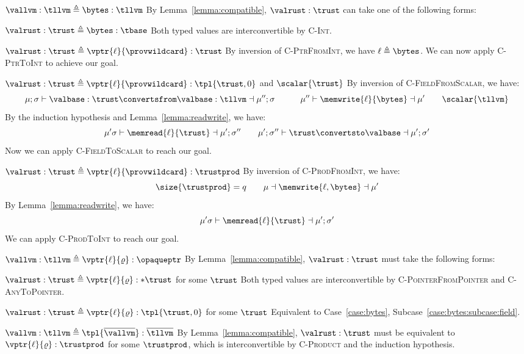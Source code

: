 
\begin{bycases}
\begin{case}{$\vallvm:\tllvm \triangleq \bytes:\tllvm$}
\label{case:bytes}
By Lemma~\ref{lemma:compatible}, $\valrust:\trust$ can take one of the following forms:
\begin{subcase}{$\valrust:\trust \triangleq \bytes:\tbase$}
Both typed values are interconvertible by \textsc{C-Int}.
\end{subcase}
\begin{subcase}{$\valrust:\trust \triangleq \vptr{\ell}{\provwildcard}:\trust$}
By inversion of \textsc{C-PtrFromInt}, we have $\ell \triangleq \bytes$. We can now apply \textsc{C-PtrToInt} to achieve our goal.
\end{subcase}
\begin{subcase}{$\valrust:\trust \triangleq \vptr{\ell}{\provwildcard}:\tpl{\trust, 0}$ and $\scalar{\trust}$}
\label{case:bytes:subcase:field}
By inversion of \textsc{C-FieldFromScalar}, we have:
$$\mu;\sigma \vdash \valbase:\trust \convertsfrom \valbase:\tllvm \dashv \mu'';\sigma \quad\quad\quad \mu'' \vdash \memwrite{\ell}{\bytes} \dashv \mu' \quad\quad \scalar{\tllvm}$$
By the induction hypothesis and Lemma~\ref{lemma:readwrite}, we have:
$$\mu'\sigma \vdash \memread{\ell}{\trust} \dashv \mu';\sigma'' \quad \quad \mu'; \sigma'' \vdash \trust \convertsto \valbase \dashv \mu';\sigma'$$
 Now we can apply \textsc{C-FieldToScalar} to reach our goal.
\end{subcase}
\begin{subcase}{$\valrust:\trust \triangleq \vptr{\ell}{\provwildcard}:\trustprod$}
By inversion of \textsc{C-ProdFromInt}, we have:
$$\size{\trustprod}=q \quad\quad \mu\dashv \memwrite{\ell, \bytes}\dashv \mu'$$
By Lemma~\ref{lemma:readwrite}, we have:
$$\mu'\sigma \vdash \memread{\ell}{\trust} \dashv \mu';\sigma'$$
We can apply \textsc{C-ProdToInt} to reach our goal.
\end{subcase}
\end{case}
\begin{case}{$\vallvm:\tllvm \triangleq \vptr{\ell}{\varrho}:\opaqueptr$}
By Lemma~\ref{lemma:compatible}, $\valrust:\trust$ must take the following forms:
\begin{subcase}{$\valrust:\trust \triangleq \vptr{\ell}{\varrho}:*\trust$ for some $\trust$}
Both typed values are interconvertible by \textsc{C-PointerFromPointer} and \textsc{C-AnyToPointer}.
\end{subcase}
\begin{subcase}{$\valrust:\trust \triangleq \vptr{\ell}{\varrho}:\tpl{\trust, 0}$ for some $\trust$}
Equivalent to Case~\ref{case:bytes}, Subcase~\ref{case:bytes:subcase:field}.
\end{subcase}
\end{case}
\begin{case}{$\vallvm:\tllvm \triangleq \tpl{\overline{\vallvm}}:\overline{\tllvm}$}
By Lemma~\ref{lemma:compatible}, $\valrust:\trust$ must be equivalent to ${\vptr{\ell}{\varrho}:\trustprod}$ for some $\trustprod$, which is interconvertible by \textsc{C-Product} and the induction hypothesis.
\end{case}
\end{bycases}
